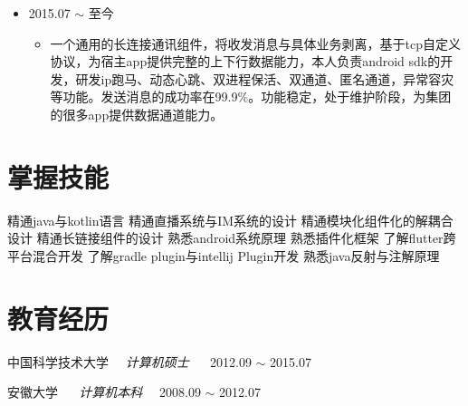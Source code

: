 \documentclass[line,margin,UTF8]{res}
\begin{document}
\begin{resume}
\begin{itemize}
\begin{itemize}

 \end{itemize}
 \end{itemize}
 
\begin{itemize}
\item {} 2015.07 $\sim$ 至今
	\vspace{-3pt}
	\begin{itemize}
		\item 
		一个通用的长连接通讯组件，将收发消息与具体业务剥离，基于tcp自定义协议，为宿主app提供完整的上下行数据能力，本人负责android sdk的开发，研发ip跑马、动态心跳、双进程保活、双通道、匿名通道，异常容灾等功能。发送消息的成功率在99.9\%。功能稳定，处于维护阶段，为集团的很多app提供数据通道能力。
\end{itemize}
\end{itemize}

\section{掌握技能}
精通java与kotlin语言
精通直播系统与IM系统的设计
精通模块化组件化的解耦合设计
精通长链接组件的设计
熟悉android系统原理
熟悉插件化框架
了解flutter跨平台混合开发
了解gradle plugin与intellij Plugin开发
熟悉java反射与注解原理

\section{教育经历}
中国科学技术大学  ~~{\sl 计算机硕士} ~~ 2012.09 $\sim$ 2015.07

安徽大学 ~~ {\sl 计算机本科} ~~2008.09 $\sim$ 2012.07

 
%


\end{resume}
\end{document}
